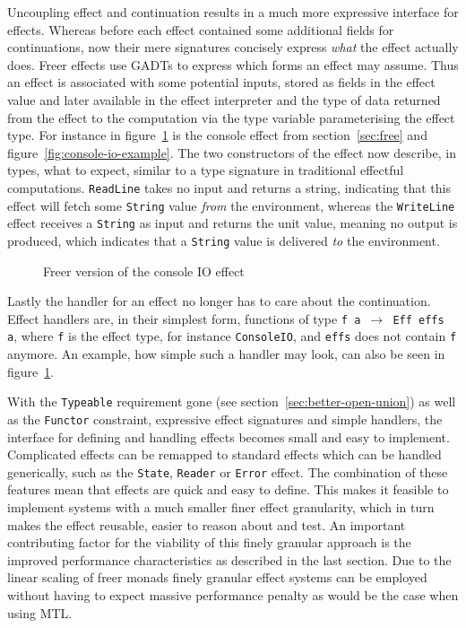 Uncoupling effect and continuation results in a much more expressive interface
for effects. Whereas before each effect contained some additional fields for
continuations, now their mere signatures concisely express \emph{what} the
effect actually does. Freer effects use GADTs to express which forms an effect
may assume. Thus an effect is associated with some potential inputs, stored as
fields in the effect value and later available in the effect interpreter and the
type of data returned from the effect to the computation via the type variable
parameterising the effect type. For instance in
figure~\ref{fig:console-io-freer} is the console effect from
section~\ref{sec:free} and figure~\ref{fig:console-io-example}. The two
constructors of the effect now describe, in types, what to expect, similar to a
type signature in traditional effectful computations. \texttt{ReadLine} takes no
input and returns a string, indicating that this effect will fetch some
\texttt{String} value \emph{from} the environment, whereas the
\texttt{WriteLine} effect receives a \texttt{String} as input and returns the
unit value, meaning no output is produced, which indicates that a
\texttt{String} value is delivered \emph{to} the environment.

\begin{figure}
  
  \caption{Freer version of the console IO effect}
  \label{fig:console-io-freer}
\end{figure}

Lastly the handler for an effect no longer has to care about the continuation.
Effect handlers are, in their simplest form, functions of type \texttt{f a $\rightarrow$
  Eff effs a}, where \texttt{f} is the effect type, for instance
\texttt{ConsoleIO}, and \texttt{effs} does not contain \texttt{f} anymore. An
example, how simple such a handler may look, can also be seen in
figure~\ref{fig:console-io-freer}.

With the \texttt{Typeable} requirement gone (see
section~\ref{sec:better-open-union}) as well as the \texttt{Functor} constraint,
expressive effect signatures and simple handlers, the interface for defining and
handling effects becomes small and easy to implement. Complicated effects can be
remapped to standard effects which can be handled generically, such as the
\texttt{State}, \texttt{Reader} or \texttt{Error} effect. The combination of
these features mean that effects are quick and easy to define. This makes it
feasible to implement systems with a much smaller finer effect granularity,
which in turn makes the effect reusable, easier to reason about and test. An
important contributing factor for the viability of this finely granular approach
is the improved performance characteristics as described in the last section.
Due to the linear scaling of freer monads finely granular effect systems can be
employed without having to expect massive performance penalty as would be the
case when using MTL.

